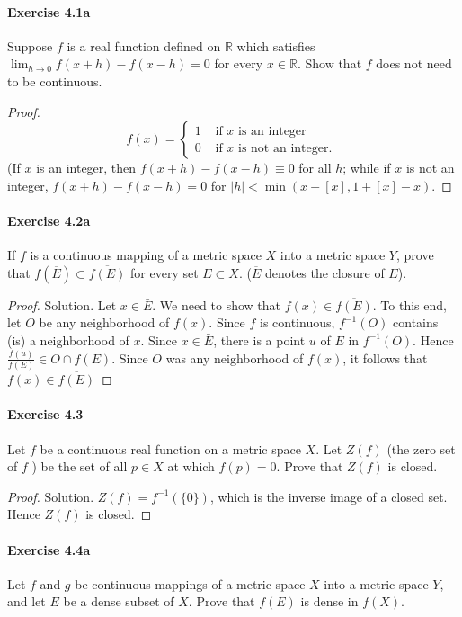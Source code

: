 \documentclass{article}
\theoremstyle{definition}
\begin{document}
\paragraph{Exercise 4.1a} Suppose $f$ is a real function defined on $\mathbb{R}$ which satisfies $\lim_{h \rightarrow 0} f(x + h) - f(x - h) = 0$ for every $x \in \mathbb{R}$. Show that $f$ does not need to be continuous.
\begin{proof}
    $$
f(x)= \begin{cases}1 & \text { if } x \text { is an integer } \\ 0 & \text { if } x \text { is not an integer. }\end{cases}
$$
(If $x$ is an integer, then $f(x+h)-f(x-h) \equiv 0$ for all $h$; while if $x$ is not an integer, $f(x+h)-f(x-h)=0$ for $|h|<\min (x-[x], 1+[x]-x)$.
\end{proof}


\paragraph{Exercise 4.2a} If $f$ is a continuous mapping of a metric space $X$ into a metric space $Y$, prove that $f(\overline{E}) \subset \overline{f(E)}$ for every set $E \subset X$. ($\overline{E}$ denotes the closure of $E$).
\begin{proof}
    Solution. Let $x \in \bar{E}$. We need to show that $f(x) \in \overline{f(E)}$. To this end, let $O$ be any neighborhood of $f(x)$. Since $f$ is continuous, $f^{-1}(O)$ contains (is) a neighborhood of $x$. Since $x \in \bar{E}$, there is a point $u$ of $E$ in $f^{-1}(O)$. Hence $\frac{f(u)}{f(E)} \in O \cap f(E)$. Since $O$ was any neighborhood of $f(x)$, it follows that $f(x) \in \overline{f(E)}$
\end{proof}


\paragraph{Exercise 4.3} Let $f$ be a continuous real function on a metric space $X$. Let $Z(f)$ (the zero set of $f$ ) be the set of all $p \in X$ at which $f(p)=0$. Prove that $Z(f)$ is closed.
\begin{proof}
    Solution. $Z(f)=f^{-1}(\{0\})$, which is the inverse image of a closed set. Hence $Z(f)$ is closed.
\end{proof}


\paragraph{Exercise 4.4a} Let $f$ and $g$ be continuous mappings of a metric space $X$ into a metric space $Y$, and let $E$ be a dense subset of $X$. Prove that $f(E)$ is dense in $f(X)$.
\end{document}
